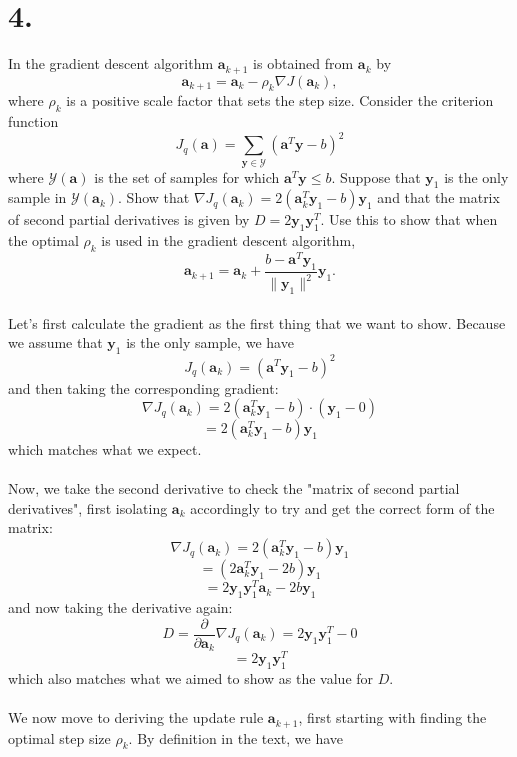 \documentclass{article}
\begin{document}
{\Large 

\section*{4.}
In the gradient descent algorithm \(\mathbf{a}_{k+1}\) is obtained from \(\mathbf{a}_k\) by 
\[
  \mathbf{a}_{k+1} = \mathbf{a}_k - \rho_k \nabla J(\mathbf{a}_k),
\]
where \(\rho_k\) is a positive scale factor that sets the step size. Consider the criterion function
\[
  J_q(\mathbf{a}) = \sum_{\mathbf{y} \in \mathcal{Y}} (\mathbf{a}^T \mathbf{y} - b)^2
\]
where \(\mathcal{Y}(\mathbf{a})\) is the set of samples for which \(\mathbf{a}^T \mathbf{y} \leq b \). Suppose that \(\mathbf{y}_1\) is the only sample in \(\mathcal{Y}(\mathbf{a}_k)\). Show that \(\nabla J_q(\mathbf{a}_k) = 2(\mathbf{a}_k^T \mathbf{y}_1 - b)\mathbf{y}_1\) and that the matrix of second partial derivatives is given by \(D = 2\mathbf{y}_1 \mathbf{y}_1^T\). Use this to show that when the optimal \(\rho_k\) is used in the gradient descent algorithm, 
\[
  \mathbf{a}_{k+1} = \mathbf{a}_k + \frac{b - \mathbf{a}^T \mathbf{y}_1}{\|\mathbf{y}_1\|^2} \mathbf{y}_1.
\] \\
Let's first calculate the gradient as the first thing that we want to show. Because we assume that \(\mathbf{y}_1\) is the only sample, we have 
\[
  J_q (\mathbf{a}_k) = (\mathbf{a}^T \mathbf{y}_1 - b)^2
\]
and then taking the corresponding gradient:
\[
  \nabla J_q (\mathbf{a}_k) = 2(\mathbf{a}_k^T \mathbf{y}_1 - b) \cdot (\mathbf{y}_1 - 0)
\]
\[
  = 2(\mathbf{a}_k^T \mathbf{y}_1 - b)\mathbf{y}_1
\]
which matches what we expect. \\ \\
Now, we take the second derivative to check the "matrix of second partial derivatives", first isolating \(\mathbf{a}_k\) accordingly to try and get the correct form of the matrix:
\[
  \nabla J_q (\mathbf{a}_k) = 2(\mathbf{a}_k^T \mathbf{y}_1 - b)\mathbf{y}_1
\]
\[
  = (2\mathbf{a}_k^T \mathbf{y}_1 - 2b)\mathbf{y}_1
\]
\[
  = 2 \mathbf{y}_1 \mathbf{y}_1^T  \mathbf{a}_k  - 2b\mathbf{y}_1
\]
and now taking the derivative again:
\[
  D = \frac{\partial}{\partial \mathbf{a}_k} \nabla J_q (\mathbf{a}_k) = 2 \mathbf{y}_1 \mathbf{y}_1^T - 0
\]
\[
  = 2 \mathbf{y}_1 \mathbf{y}_1^T
\]
which also matches what we aimed to show as the value for \(D\). \\ \\
We now move to deriving the update rule \(\mathbf{a}_{k+1}\), first starting with finding the optimal step size \(\rho_k\). By definition in the text, we have 
}
\end{document}
